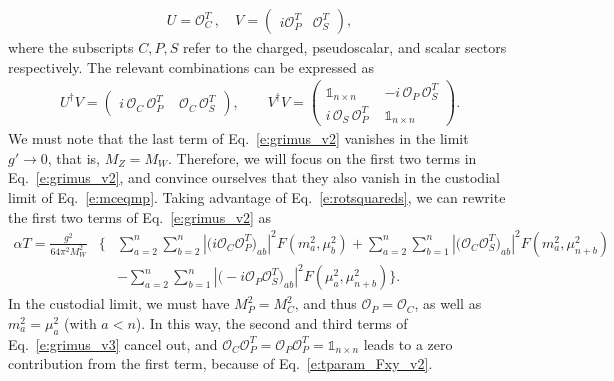 \documentclass[11pt]{article}
\begin{document}
%
\begin{eqnarray}
\label{e:tparam_rot12}
U=\mathcal{O}_C^T \,, \quad 
V=\begin{pmatrix}
i\mathcal{O}_P^T&\mathcal{O}_S^T
\end{pmatrix}, 
\end{eqnarray} 
%
where the subscripts $C, P, S$ refer to the charged, pseudoscalar, and scalar sectors respectively.  
The relevant combinations can be expressed as
%
\begin{eqnarray}
\label{e:rotsquareds}
U^\dagger V = \begin{pmatrix} i \, \mathcal{O}_C \, \mathcal{O}_P^T \,\,  & \mathcal{O}_C \, \mathcal{O}_S^T \end{pmatrix}, \qquad 
V^\dagger V = \begin{pmatrix} \mathbb{1}_{n\times n} \,\, & -i \, \mathcal{O}_P \, \mathcal{O}_S^T \\ i \, \mathcal{O}_S \, \mathcal{O}_P^T \,\,  & \mathbb{1}_{n \times n}\end{pmatrix}.
\end{eqnarray}
%
We must note that the last term of Eq.~\eqref{e:grimus_v2} vanishes in the limit $g'\to0$, that is, $M_Z=M_W$.  
Therefore, we will focus on the first two terms in Eq.~\eqref{e:grimus_v2}, and convince ourselves that they also vanish in the custodial limit of Eq.~\eqref{e:mceqmp}.  
Taking advantage of Eq.~\eqref{e:rotsquareds}, we can rewrite the first two terms of Eq.~\eqref{e:grimus_v2} as 
\begin{eqnarray}
\label{e:grimus_v3}
\alpha T =\frac{g^2} {64\pi^2M_W^2} &\bigg\{ &
\sum_{a=2}^{n}\sum_{b=2}^{n} \left\lvert \big( i \mathcal{O}_C \mathcal{O}_P^T \big)_{ab} \right\rvert^2 F \left( m_a^2, \mu_b^2 \right) + \sum_{a=2}^{n}\sum_{b=1}^{n} \left\lvert \big( \mathcal{O}_C \mathcal{O}_S^T \big)_{ab}\right\rvert^2 F\left( m_a^2, \mu_{n+b}^2\right) \nonumber \\
&& - \sum_{a=2}^{n}\sum_{b=1}^{n} \left\lvert \big(-i \mathcal{O}_P \mathcal{O}_S^T \big) _{ab} \right\rvert^2 F\left( \mu_a^2, \mu^2_{n+b} \right) \bigg\}.
\end{eqnarray}
%
In the custodial limit, we must have $M_P^2=M_C^2$, and thus $\mathcal{O}_P = \mathcal{O}_C$, as well as $m_a^2 = \mu_a^2$ (with $a <n$).  
In this way, the second and third terms of Eq.~\eqref{e:grimus_v3} cancel out, and $\mathcal{O}_C \mathcal{O}_P^T = \mathcal{O}_P \mathcal{O}_P^T = \mathbb{1}_{n \times n}$ leads to a zero contribution from the first term, because of Eq.~\eqref{e:tparam_Fxy_v2}.
%
\end{document}
